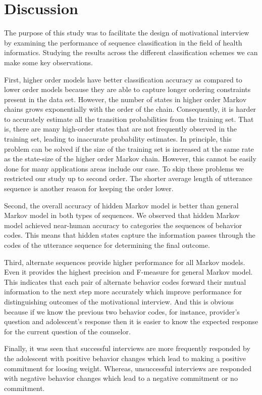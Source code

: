\documentclass{amia}
\begin{document}
\section*{Discussion}
The purpose of this study was to facilitate the design of motivational interview by examining the performance of sequence classification in the field of health informatics. Studying the results across the different classification schemes we can make some key observations. 

First, higher order models have better classification accuracy as compared to lower order models because they are able to capture longer ordering constraints present in the data set. However, the number of states in higher order Markov chains grows exponentially with the order of the chain. Consequently, it is harder to accurately estimate all the transition probabilities from the training set. That is, there are many high-order states that are not frequently observed in the training set, leading to inaccurate probability estimates. In principle, this problem can be solved if the size of the training set is increased at the same rate as the state-size of the higher order Markov chain. However, this cannot be easily done for many applications areas include our case. To skip these problems we restricted our study up to second order. The shorter average length of utterance sequence is another reason for keeping the order lower.  

Second, the overall accuracy of hidden Markov model is better than general Markov model in both types of sequences. We observed that hidden Markov model achieved near-human accuracy to categories the sequences of behavior codes. This means that hidden states capture the information passes through the codes of the utterance sequence for determining the final outcome. 

Third, alternate sequences provide higher performance for all Markov models. Even it provides the highest precision and F-measure for general Markov model. This indicates that each pair of alternate behavior codes forward their mutual information to the next step more accurately which improve performance for distinguishing outcomes of the motivational interview. And this is obvious because if we know the previous two behavior codes, for instance, provider's question and adolescent's response then it is easier to know the expected response for the current question of the counselor.   

Finally, it was seen that successful interviews are more frequently responded by the adolescent with positive behavior changes which lead to making a positive commitment for loosing weight. Whereas, unsuccessful interviews are responded with negative behavior changes which lead to a negative commitment or no commitment. 
\end{document}
